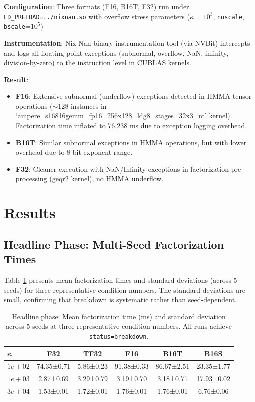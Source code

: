 \documentclass[11pt,a4paper]{article}
\begin{document}
\textbf{Configuration}: Three formats (F16, B16T, F32) run under \texttt{LD\_PRELOAD=../nixnan.so} with overflow stress parameters ($\kappa=10^3$, \texttt{noscale}, \texttt{bscale}=$10^5$)

\textbf{Instrumentation}: Nix-Nan binary instrumentation tool (via NVBit) intercepts and logs all floating-point exceptions (subnormal, overflow, NaN, infinity, division-by-zero) to the instruction level in CUBLAS kernels.

\textbf{Result}:
\begin{itemize}
  \item \textbf{F16}: Extensive subnormal (underflow) exceptions detected in HMMA tensor operations ($\sim$128 instances in `ampere\_s16816gemm\_fp16\_256x128\_ldg8\_stages\_32x3\_nt' kernel). Factorization time inflated to 76,238 ms due to exception logging overhead.
  \item \textbf{B16T}: Similar subnormal exceptions in HMMA operations, but with lower overhead due to 8-bit exponent range.
  \item \textbf{F32}: Cleaner execution with NaN/Infinity exceptions in factorization pre-processing (geqr2 kernel), no HMMA underflow.
\end{itemize}

\section{Results}

\subsection{Headline Phase: Multi-Seed Factorization Times}

Table \ref{tab:headline} presents mean factorization times and standard deviations (across 5 seeds) for three representative condition numbers. The standard deviations are small, confirming that breakdown is systematic rather than seed-dependent.

\begin{table}[!h]
\centering
\begin{tabular}{l c c c c c}
\toprule
$\mathbf{\kappa}$ & F32 & TF32 & F16 & B16T & B16S \\
\midrule
$1e+02$ & 74.35±0.71 & 5.86±0.23 & 91.38±0.33 & 86.67±2.51 & 23.35±1.77 \\
$1e+03$ & 2.87±0.69 & 3.29±0.79 & 3.19±0.70 & 3.18±0.71 & 17.93±0.02 \\
$3e+04$ & 1.53±0.01 & 1.72±0.01 & 1.76±0.01 & 1.76±0.01 & 6.76±0.06 \\
\bottomrule
\end{tabular}
\caption{Headline phase: Mean factorization time (ms) and standard deviation across 5 seeds at three representative condition numbers. All runs achieve \texttt{status=breakdown}.}
\label{tab:headline}
\end{table}
\end{document}
